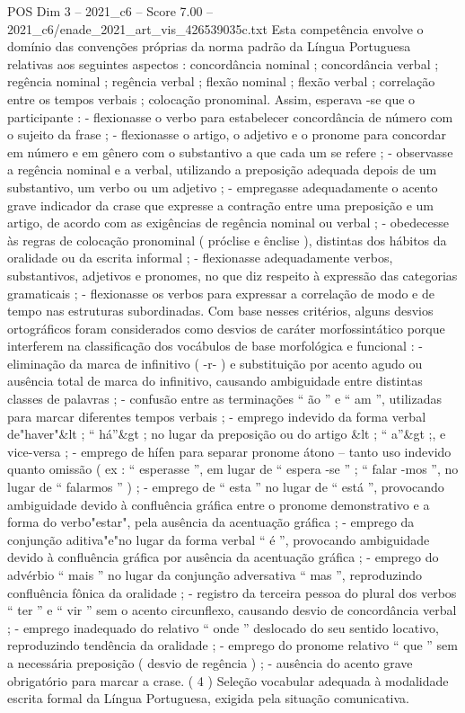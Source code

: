 \begin{textsample}{POS Dim 3 – 2021\_c6 – Score 7.00 – 2021\_c6/enade\_2021\_art\_vis\_426539035c.txt}
Esta competência envolve o domínio das convenções próprias da norma padrão da Língua Portuguesa relativas aos seguintes aspectos : concordância nominal ; concordância verbal ; regência nominal ; regência verbal ; flexão nominal ; flexão verbal ; correlação entre os tempos verbais ; colocação pronominal.
Assim, esperava -se que o participante : - flexionasse o verbo para estabelecer concordância de número com o sujeito da frase ; - flexionasse o artigo, o adjetivo e o pronome para concordar em número e em gênero com o substantivo a que cada um se refere ; - observasse a regência nominal e a verbal, utilizando a preposição adequada depois de um substantivo, um verbo ou um adjetivo ; - empregasse adequadamente o acento grave indicador da crase que expresse a contração entre uma preposição e um artigo, de acordo com as exigências de regência nominal ou verbal ; - obedecesse às regras de colocação pronominal ( próclise e ênclise ), distintas dos hábitos da oralidade ou da escrita informal ; - flexionasse adequadamente verbos, substantivos, adjetivos e pronomes, no que diz respeito à expressão das categorias gramaticais ; - flexionasse os verbos para expressar a correlação de modo e de tempo nas estruturas subordinadas.
Com base nesses critérios, alguns desvios ortográficos foram considerados como desvios de caráter morfossintático porque interferem na classificação dos vocábulos de base morfológica e funcional : - eliminação da marca de infinitivo ( -r- ) e substituição por acento agudo ou ausência total de marca do infinitivo, causando ambiguidade entre distintas classes de palavras ; - confusão entre as terminações “ ão ” e “ am ”, utilizadas para marcar diferentes tempos verbais ; - emprego indevido da forma verbal de"haver"\&lt ; “ há”\&gt ; no lugar da preposição ou do artigo \&lt ; “ a”\&gt ;, e vice-versa ; - emprego de hífen para separar pronome átono – tanto uso indevido quanto omissão ( ex : “ esperasse ”, em lugar de “ espera -se ” ; “ falar -mos ”, no lugar de “ falarmos ” ) ; - emprego de “ esta ” no lugar de “ está ”, provocando ambiguidade devido à confluência gráfica entre o pronome demonstrativo e a forma do verbo"estar", pela ausência da acentuação gráfica ; - emprego da conjunção aditiva"e"no lugar da forma verbal “ é ”, provocando ambiguidade devido à confluência gráfica por ausência da acentuação gráfica ; - emprego do advérbio “ mais ” no lugar da conjunção adversativa “ mas ”, reproduzindo confluência fônica da oralidade ; - registro da terceira pessoa do plural dos verbos “ ter ” e “ vir ” sem o acento circunflexo, causando desvio de concordância verbal ; - emprego inadequado do relativo “ onde ” deslocado do seu sentido locativo, reproduzindo tendência da oralidade ; - emprego do pronome relativo “ que ” sem a necessária preposição ( desvio de regência ) ; - ausência do acento grave obrigatório para marcar a crase. ( 4 ) Seleção vocabular adequada à modalidade escrita formal da Língua Portuguesa, exigida pela situação comunicativa.

\end{textsample}
